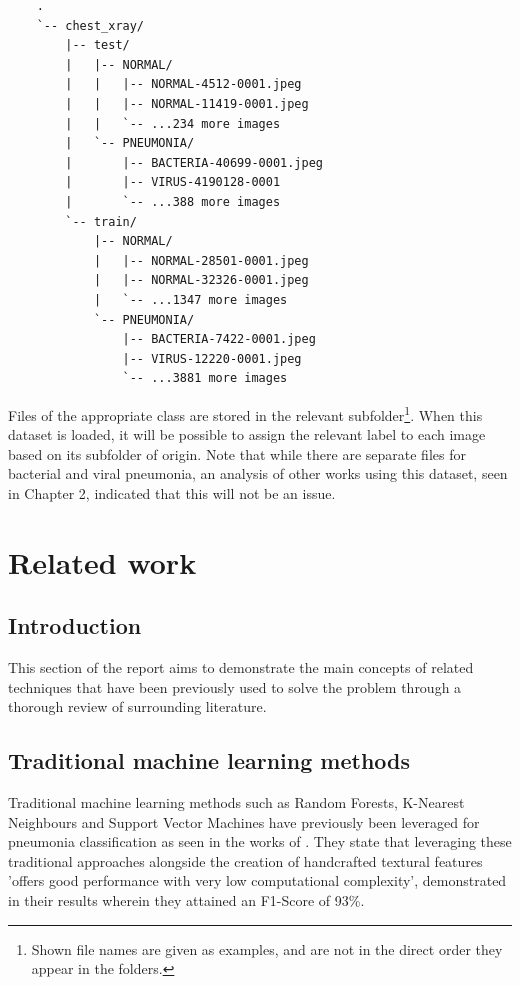 \documentclass[12pt]{report}
\begin{document}
\begin{verbatim}
    .
    `-- chest_xray/
        |-- test/
        |   |-- NORMAL/
        |   |   |-- NORMAL-4512-0001.jpeg
        |   |   |-- NORMAL-11419-0001.jpeg
        |   |   `-- ...234 more images
        |   `-- PNEUMONIA/
        |       |-- BACTERIA-40699-0001.jpeg
        |       |-- VIRUS-4190128-0001
        |       `-- ...388 more images
        `-- train/
            |-- NORMAL/
            |   |-- NORMAL-28501-0001.jpeg
            |   |-- NORMAL-32326-0001.jpeg
            |   `-- ...1347 more images
            `-- PNEUMONIA/
                |-- BACTERIA-7422-0001.jpeg
                |-- VIRUS-12220-0001.jpeg
                `-- ...3881 more images
\end{verbatim}

\noindent Files of the appropriate class are stored in the relevant subfolder\footnote{Shown file names are given as examples, and are not in the direct order they appear in the folders.}.
When this dataset is loaded, it will be possible to 
assign the relevant label to each image based on its subfolder of origin. Note that while there are separate files for bacterial and 
viral pneumonia, an analysis of other works using this dataset, seen in Chapter 2, indicated that this will not be an issue.


\chapter{Related work}

\section{Introduction}
This section of the report aims to demonstrate the main concepts
of related techniques that have been previously used to solve the problem 
through a thorough review of surrounding literature.


\section{Traditional machine learning methods}
Traditional machine learning methods such as Random Forests, K-Nearest Neighbours and Support 
Vector Machines have previously been leveraged for pneumonia classification as seen in the works of 
\textcite{ortiz-toroAutomaticDetectionPneumonia2022}. They state that leveraging these traditional approaches
alongside the creation of handcrafted textural features 'offers good performance with very low computational complexity',
demonstrated in their results wherein they attained an F1-Score of 93\%.
\end{document}
